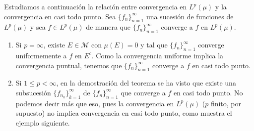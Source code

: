 \documentclass[a4paper, 11pt, oneside]{report}
\begin{document}
Estudiamos a continuación la relación entre convergencia en $L^p(\mu)$ y la convergencia en casi todo punto. Sea $\{f_n\}_{n=1}^\infty$ una sucesión de funciones de $L^p(\mu)$ y sea $f \in L^p(\mu)$ de manera que $\{f_n\}_{n=1}^\infty$ converge a $f$ en $L^p(\mu)$.
\begin{enumerate}
  \item Si $p = \infty$, existe $E \in \mathcal{M}$ con $\mu(E)=0$ y tal que $\{f_n\}_{n=1}^\infty$ converge uniformemente a $f$ en $E^c$. Como la convergencia uniforme implica la convergencia puntual, tenemos que $\{f_n\}_{n=1}^\infty$ converge a $f$ en casi todo punto.
  \item Si $1 \leq p < \infty$, en la demostración del teorema se ha visto que existe una subsucesión $\{f_{n_k}\}_{k=1}^\infty$ de $\{f_n\}_{n=1}^\infty$ que converge a $f$ en casi todo punto. No podemos decir más que eso, pues la convergencia en $L^p(\mu)$ ($p$ finito, por supuesto) no implica convergencia en casi todo punto, como muestra el ejemplo siguiente.
\end{enumerate}
\end{document}
